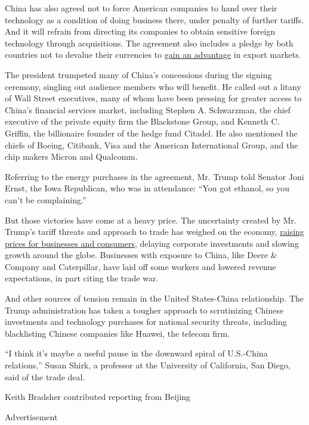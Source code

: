 China has also agreed not to force American companies to hand over their
technology as a condition of doing business there, under penalty of
further tariffs. And it will refrain from directing its companies to
obtain sensitive foreign technology through acquisitions. The agreement
also includes a pledge by both countries not to devalue their currencies
to
\href{https://www.nytimes3xbfgragh.onion/2019/08/05/business/china-currency.html}{gain
an advantage} in export markets.

The president trumpeted many of China's concessions during the signing
ceremony, singling out audience members who will benefit. He called out
a litany of Wall Street executives, many of whom have been pressing for
greater access to China's financial services market, including Stephen
A. Schwarzman, the chief executive of the private equity firm the
Blackstone Group, and Kenneth C. Griffin, the billionaire founder of the
hedge fund Citadel. He also mentioned the chiefs of Boeing, Citibank,
Visa and the American International Group, and the chip makers Micron
and Qualcomm.

Referring to the energy purchases in the agreement, Mr. Trump told
Senator Joni Ernst, the Iowa Republican, who was in attendance: ``You
got ethanol, so you can't be complaining.''

But those victories have come at a heavy price. The uncertainty created
by Mr. Trump's tariff threats and approach to trade has weighed on the
economy,
\href{https://www.nytimes3xbfgragh.onion/2020/01/06/business/economy/trade-war-tariffs.html}{raising
prices for businesses and consumers}, delaying corporate investments and
slowing growth around the globe. Businesses with exposure to China, like
Deere \& Company and Caterpillar, have laid off some workers and lowered
revenue expectations, in part citing the trade war.

And other sources of tension remain in the United States-China
relationship. The Trump administration has taken a tougher approach to
scrutinizing Chinese investments and technology purchases for national
security threats, including blacklisting Chinese companies like Huawei,
the telecom firm.

``I think it's maybe a useful pause in the downward spiral of U.S.-China
relations,'' Susan Shirk, a professor at the University of California,
San Diego, said of the trade deal.

Keith Bradsher contributed reporting from Beijing

Advertisement


